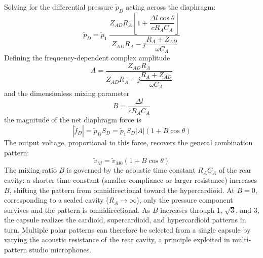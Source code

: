 Solving for the differential pressure \(\tilde{p}_D\) acting across the diaphragm:
\[
\tilde{p}_D = \tilde{p}_1\;\frac{Z_{AD} R_A\!\left[1 + \dfrac{\Delta l\cos\theta}{c R_A C_A}\right]}{Z_{AD} R_A - j \dfrac{R_A + Z_{AD}}{\omega C_A}}
\]
Defining the frequency-dependent complex amplitude
\[
A = \frac{Z_{AD} R_A}{Z_{AD} R_A - j \dfrac{R_A + Z_{AD}}{\omega C_A}}
\]
and the dimensionless mixing parameter
\[
B = \frac{\Delta l}{c R_A C_A}
\]
the magnitude of the net diaphragm force is
\[
|\tilde{f}_D| = \tilde{p}_D S_D = \tilde{p}_1 S_D |A| (1 + B\cos\theta)
\]
The output voltage, proportional to this force, recovers the general combination pattern:
\[
\tilde{v}_M = \tilde{v}_{M0} (1 + B\cos\theta)
\]
The mixing ratio \(B\) is governed by the acoustic time constant \(R_A C_A\) of the rear cavity: a shorter time constant (smaller compliance or larger resistance) increases \(B\), shifting the pattern from omnidirectional toward the hypercardioid.
At \(B = 0\), corresponding to a sealed cavity (\(R_A \to \infty\)), only the pressure component survives and the pattern is omnidirectional.
As \(B\) increases through \(1\), \(\sqrt{3}\), and \(3\), the capsule realizes the cardioid, supercardioid, and hypercardioid patterns in turn.
Multiple polar patterns can therefore be selected from a single capsule by varying the acoustic resistance of the rear cavity, a principle exploited in multi-pattern studio microphones.
